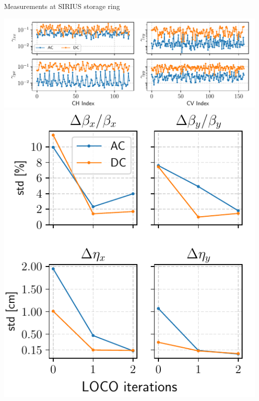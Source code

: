 \documentclass[aspectratio=169]{beamer}
\begin{document}
\begin{frame}{Measurements at SIRIUS storage ring}
\begin{minipage}{0.49\textwidth}
        \centering
        \includegraphics[width=\textwidth]{MOPOTK002_f4.pdf}
        \includegraphics[height=0.6\textheight]{MOPOTK002_f5.pdf}
    \end{minipage}
\end{frame}
\end{document}
